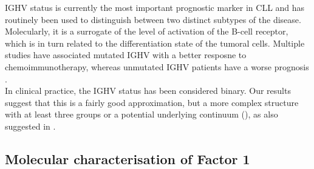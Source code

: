 IGHV status is currently the most important prognostic marker in CLL and has routinely been used to distinguish between two distinct subtypes of the disease\cite{Fabbri2016}. Molecularly, it is a surrogate of the level of activation of the B-cell receptor, which is in turn related to the differentiation state of the tumoral cells. Multiple studies have associated mutated IGHV with a better resposne to chemoimmunotherapy, whereas unmutated IGHV patients have a worse prognosis \cite{Fabbri2016,Bulian2017,Crombie2017}.\\
In clinical practice, the IGHV status has been considered binary. Our results suggest that this is a fairly good approximation, but a more complex structure with at least three groups or a potential underlying continuum (), as also suggested in \cite{Queiros2015}.





\subsection{Molecular characterisation of Factor 1}

